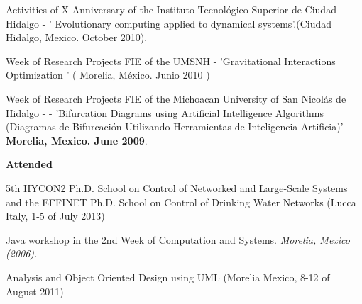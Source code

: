 \documentclass[10pt]{article}
\newenvironment{innerlist}[1][\enskip\textbullet]%
        {\begin{compactitem}[#1]}{\end{compactitem}}
\newcommand{\blankline}{\quad\pagebreak[2]}
\begin{document}
\begin{innerlist}
\item Activities of X Anniversary of the Instituto Tecnológico Superior de Ciudad Hidalgo - ' Evolutionary computing applied to dynamical systems'.(Ciudad Hidalgo, Mexico. October 2010).
\item Week of Research Projects FIE of the UMSNH - 'Gravitational Interactions Optimization ' ( Morelia, México. Junio 2010 )

\item Week of Research Projects FIE of the Michoacan University of San Nicolás de Hidalgo - - 'Bifurcation Diagrams using Artificial Intelligence Algorithms (Diagramas de Bifurcación Utilizando Herramientas de Inteligencia Artificia)' \textbf{Morelia, Mexico. June 2009}.

\end{innerlist}

\blankline


\textbf{Attended}
\begin{innerlist}
\item 5th HYCON2 Ph.D. School on Control of Networked and Large-Scale Systems and the EFFINET Ph.D. School on Control of Drinking Water Networks  (Lucca Italy, 1-5 of July 2013)
\item Java workshop in the 2nd Week of Computation and Systems. \textit{Morelia, Mexico (2006).}
\item Analysis and Object Oriented Design using UML  (Morelia Mexico,  8-12 of August 2011)

\end{innerlist}
\end{document}
